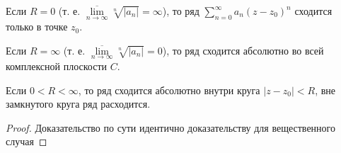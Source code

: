 Если $R = 0$ (т. е. $\overline{\lim\limits_{n\to\infty}}\sqrt[n]{|a_n|} = \infty$), то ряд $\displaystyle\sum_{n=0}^{\infty}a_n(z-z_0)^n$ сходится только в точке $z_0$.

Если $R = \infty$ (т. е. $\overline{\lim\limits_{n\to\infty}}\sqrt[n]{|a_n|} = 0$), то ряд сходится абсолютно во всей комплексной плоскости $C$.

Если $0 < R < \infty$, то ряд сходится абсолютно внутри круга $|z-z_0| < R$, вне замкнутого круга ряд расходится.


\begin{proof}
Доказательство по сути идентично доказательству для вещественного случая
\end{proof}